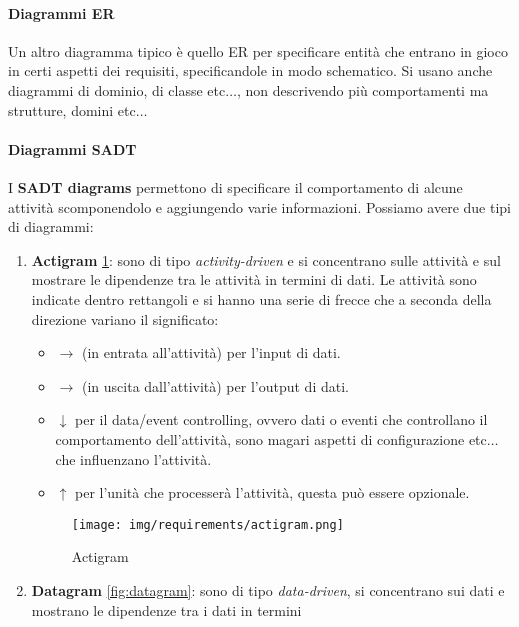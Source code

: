 \paragraph{Diagrammi ER}
Un altro diagramma tipico è quello ER per specificare entità che entrano in gioco
in certi aspetti dei requisiti, specificandole in modo schematico. Si usano anche
diagrammi di dominio, di classe etc$\dots$, non descrivendo più comportamenti
ma strutture, domini etc$\dots$
\paragraph{Diagrammi SADT}
I \textbf{SADT diagrams} permettono di specificare il comportamento di alcune
attività scomponendolo e aggiungendo varie informazioni. Possiamo avere due tipi
di diagrammi:
\begin{enumerate}
      \item \textbf{Actigram} \ref{fig:actigram}: sono di tipo \textit{activity-driven}
            e si concentrano sulle attività e sul mostrare le dipendenze tra le
            attività in termini di dati. Le attività sono indicate dentro
            rettangoli e si hanno una serie di frecce che a seconda della direzione
            variano il significato:
            \begin{itemize}
                  \item $\to$ (in entrata all'attività) per l'input di dati.
                  \item $\to$ (in uscita dall'attività) per l'output di dati.
                  \item $\downarrow$ per il data/event controlling, ovvero dati
                        o eventi che controllano il comportamento dell'attività,
                        sono magari aspetti di configurazione etc$\dots$ che
                        influenzano l'attività.
                  \item $\uparrow$ per l'unità che processerà l'attività, questa
                        può essere opzionale.
            \end{itemize}
            \begin{figure}[!ht]
                  \centering
                  \texttt{[image: img/requirements/actigram.png]}
                  \caption{Actigram}
                  \label{fig:actigram}
            \end{figure}
      \item \textbf{Datagram} \ref{fig:datagram}: sono di tipo \textit{data-driven},
            si concentrano sui dati e mostrano le dipendenze tra i dati in termini

\end{enumerate}
